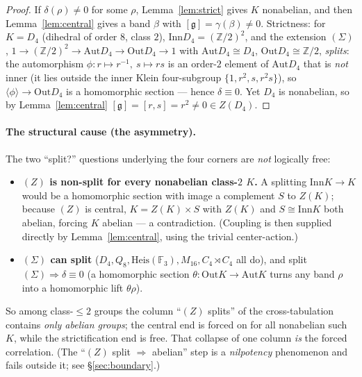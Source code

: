\documentclass[11pt]{article}
\theoremstyle{definition}
\newcommand{\Z}{\mathbb{Z}}
\newcommand{\F}{\mathbb{F}}
\newcommand{\Aut}{\mathrm{Aut}}
\newcommand{\Inn}{\mathrm{Inn}}
\newcommand{\Out}{\mathrm{Out}}
\newcommand{\gerbe}{\mathfrak{g}}
\newcommand{\Heis}{\mathrm{Heis}}
\begin{document}
\begin{proof}
If $\delta(\rho)\neq0$ for some $\rho$, Lemma~\ref{lem:strict} gives $K$ nonabelian, and then
Lemma~\ref{lem:central} gives a band $\beta$ with $[\gerbe]=\gamma(\beta)\neq0$. Strictness:
for $K=D_4$ (dihedral of order $8$, class $2$), $\Inn D_4=(\Z/2)^2$, and the extension
$(\Sigma)$, $1\to(\Z/2)^2\to\Aut D_4\to\Out D_4\to1$ with $\Aut D_4\cong D_4$,
$\Out D_4\cong\Z/2$, \emph{splits}: the automorphism $\phi:r\mapsto r^{-1},\ s\mapsto rs$ is an
order-$2$ element of $\Aut D_4$ that is \emph{not} inner (it lies outside the inner Klein
four-subgroup $\{1,r^2,s,r^2s\}$), so $\langle\phi\rangle\to\Out D_4$ is a homomorphic section
--- hence $\delta\equiv0$. Yet $D_4$ is nonabelian, so by Lemma~\ref{lem:central}
$[\gerbe]=[r,s]=r^2\neq0\in Z(D_4)$.
\end{proof}

\paragraph{The structural cause (the asymmetry).} The two ``split?'' questions underlying the
four corners are \emph{not} logically free:
\begin{itemize}
\item \textbf{$(Z)$ is non-split for every nonabelian class-$2$ $K$.} A splitting
$\Inn K\to K$ would be a homomorphic section with image a complement $S$ to $Z(K)$; because
$(Z)$ is central, $K=Z(K)\times S$ with $Z(K)$ and $S\cong\Inn K$ both abelian, forcing $K$
abelian --- a contradiction. (Coupling is then supplied directly by Lemma~\ref{lem:central},
using the trivial center-action.)
\item \textbf{$(\Sigma)$ can split} ($D_4,Q_8,\Heis(\F_3),M_{16},C_4\rtimes C_4$ all do), and
split $(\Sigma)\Rightarrow\delta\equiv0$ (a homomorphic section
$\theta:\Out K\to\Aut K$ turns any band $\rho$ into a homomorphic lift $\theta\rho$).
\end{itemize}
So among class-$\le2$ groups the column ``$(Z)$ splits'' of the cross-tabulation contains
\emph{only abelian groups}; the central end is forced on for all nonabelian such $K$, while the
strictification end is free. That collapse of one column \emph{is} the forced correlation. (The
``$(Z)$ split $\Rightarrow$ abelian'' step is a \emph{nilpotency} phenomenon and fails outside
it; see \S\ref{sec:boundary}.)
\end{document}
